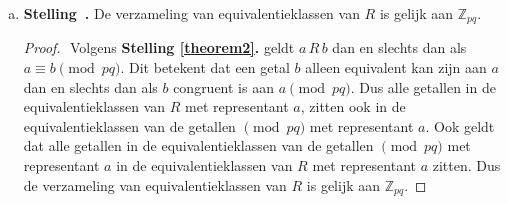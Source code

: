 \documentclass[12pt, dutch, a4paper]{article}
\theoremstyle{definition}
\newenvironment{shortthm}
  {\refstepcounter{theorem}\textbf{Stelling~\thetheorem.}}%
{\enskip}
\begin{document}
\begin{enumerate}[(a).]
  Dit is een biconditionele implicatie, dus de implicatie moet allebei de kanten op gelden.
  Eerst bewijs ik de implicatie van links naar rechts, 
  dat wil zeggen $a\,R\,b$ impliceert $a \equiv b \pmod{pq}$.

  \begin{proof} $ $ \newline
    Neem aan $a\,R\,b$. \newline
    Dan geldt vanuit de definitie van $R$ dat $p \mid b - a$ en $q \mid b - a$. 

    Omdat $p$ en $q$ priemgetallen zijn, kunnen dit geen delers van elkaar zijn. \newline
    Omdat geldt $p \mid b - a$ \'en $q \mid b - a$, 
    kunnen we $b - a$ schrijven als $b - a = kpq$ voor een $k \in \mathbb{Z}$.

    Dus $b - a \equiv 0 \pmod{pq}$ en $b \equiv a \pmod{pq}$. \newline
  \end{proof}

  Om het bewijs van \textbf{Stelling \ref{theorem2}.} af te maken, 
  bewijzen we nu de implicatie de andere kant op. 
  Dat wil zeggen $a \equiv b \pmod{pq}$ impliceert $a\,R\,b$.
  
  \begin{proof} $ $ \newline
    Neem aan $a \equiv b \pmod{pq}$. \newline
    Dus $a - b \equiv 0 \pmod{pq}$. \newline
    Dus $b - a \equiv 0 \pmod{pq}$. \newline
    Dus $pq \mid b - a$. \newline  
    Dan kunnen we $  - a$ schrijven als $b - a = kpq$ voor een $k \in \mathbb{Z}$. \newline
    Dus $p \mid b - a$ en $q \mid b - a$. \newline
  \end{proof}

  \item 
  \begin{shortthm}
    De verzameling van equivalentieklassen van $R$ is gelijk aan $\mathbb{Z}_{pq}$.
  \end{shortthm}

  \begin{proof} $ $ \newline
    Volgens \textbf{Stelling \ref{theorem2}.} geldt $a\,R\,b$ dan en slechts dan als 
    $a \equiv b \pmod{pq}$. 
    Dit betekent dat een getal $b$ alleen equivalent kan zijn aan $a$ dan en slechts dan 
    als $b$ congruent is aan $a \pmod{pq}$.
    Dus alle getallen in de equivalentieklassen van $R$ met representant $a$,
    zitten ook in de equivalentieklassen van de getallen $\pmod{pq}$ met representant $a$. 
    Ook geldt dat  
    alle getallen in de equivalentieklassen van de getallen $\pmod{pq}$ met representant $a$
    in de equivalentieklassen van $R$ met representant $a$ zitten. 
    Dus de verzameling van equivalentieklassen van $R$ is gelijk aan $\mathbb{Z}_{pq}$.  
    \newline
  \end{proof}
\end{enumerate}
\end{document}
